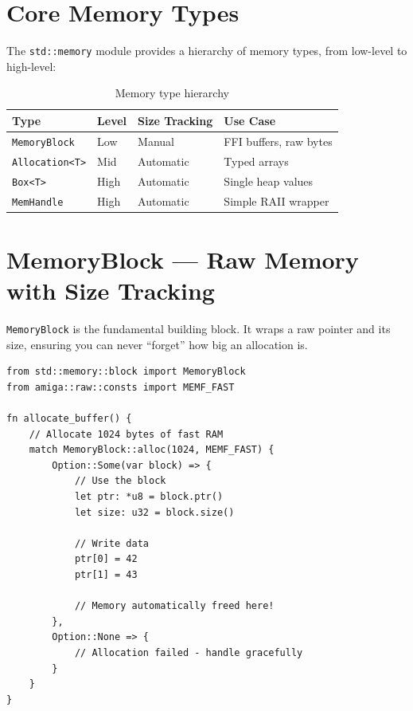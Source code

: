 \section{Core Memory Types}
\label{sec:memory-types}

The \texttt{std::memory} module provides a hierarchy of memory types, from low-level to high-level:

\begin{table}[h]
\centering
\begin{tabular}{llll}
\textbf{Type} & \textbf{Level} & \textbf{Size Tracking} & \textbf{Use Case} \\
\hline
\texttt{MemoryBlock} & Low & Manual & FFI buffers, raw bytes \\
\texttt{Allocation<T>} & Mid & Automatic & Typed arrays \\
\texttt{Box<T>} & High & Automatic & Single heap values \\
\texttt{MemHandle} & High & Automatic & Simple RAII wrapper \\
\end{tabular}
\caption{Memory type hierarchy}
\end{table}

\section{MemoryBlock --- Raw Memory with Size Tracking}
\label{sec:memoryblock}

\texttt{MemoryBlock} is the fundamental building block. It wraps a raw pointer and its size, ensuring you can never ``forget'' how big an allocation is.

\begin{lstlisting}
from std::memory::block import MemoryBlock
from amiga::raw::consts import MEMF_FAST

fn allocate_buffer() {
    // Allocate 1024 bytes of fast RAM
    match MemoryBlock::alloc(1024, MEMF_FAST) {
        Option::Some(var block) => {
            // Use the block
            let ptr: *u8 = block.ptr()
            let size: u32 = block.size()

            // Write data
            ptr[0] = 42
            ptr[1] = 43

            // Memory automatically freed here!
        },
        Option::None => {
            // Allocation failed - handle gracefully
        }
    }
}
\end{lstlisting}

